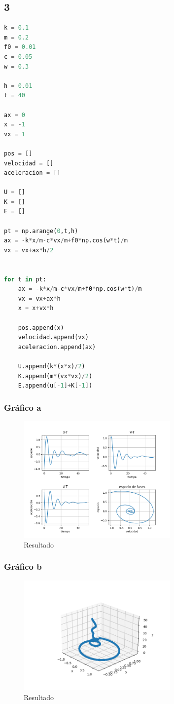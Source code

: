 \documentclass{article}
\begin{document}
\subsection{3}
\begin{lstlisting}[language=Python,caption=Desafío 1.1]
k = 0.1
m = 0.2
f0 = 0.01
c = 0.05
w = 0.3

h = 0.01
t = 40

ax = 0
x = -1
vx = 1

pos = []
velocidad = []
aceleracion = []

U = []
K = []
E = []

pt = np.arange(0,t,h)
ax = -k*x/m-c*vx/m+f0*np.cos(w*t)/m
vx = vx+ax*h/2


for t in pt:
    ax = -k*x/m-c*vx/m+f0*np.cos(w*t)/m
    vx = vx+ax*h
    x = x+vx*h

    pos.append(x)
    velocidad.append(vx)
    aceleracion.append(ax)

    U.append(k*(x*x)/2)
    K.append(m*(vx*vx)/2)
    E.append(u[-1]+K[-1])
\end{lstlisting}
\subsubsection{Gráfico a}
\begin{figure}[H]
    \centering
    \includegraphics[width=0.7\textwidth]{Figure_3_1.png}
    \caption{Resultado}
\end{figure}

\subsubsection{Gráfico b}
\begin{figure}[H]
    \centering
    \includegraphics[width=0.7\textwidth]{Figure_3_2.png}
    \caption{Resultado}
\end{figure}
\end{document}
